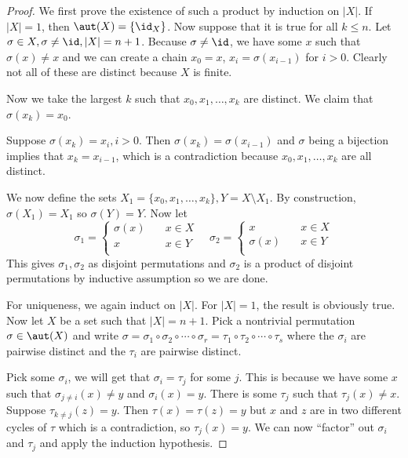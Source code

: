 \begin{proof}
We first prove the existence of such a product by induction on $|X|$. If
$|X| = 1$, then $\aut(X) = \lbrace \id_X \rbrace$. Now suppose that it
is true for all $k \leq n$. Let $\sigma \in X, \sigma \neq \id, |X| = n
+ 1$.  Because $\sigma \neq \id$, we have some $x$ such that $\sigma(x)
\neq x$ and we can create a chain $x_0 = x$, $x_i = \sigma(x_{i - 1})$
for $i > 0$. Clearly not all of these are distinct because $X$ is
finite.

Now we take the largest $k$ such that $x_0, x_1, \dots, x_k$ are
distinct. We claim that $\sigma(x_k) = x_0$.

Suppose $\sigma(x_k) = x_i, i > 0$. Then $\sigma(x_k) = \sigma(x_{i -
1})$ and $\sigma$ being a bijection implies that $x_k = x_{i - 1}$,
which is a contradiction because $x_0, x_1, \dots, x_k$ are all
distinct.

We now define the sets $X_1 = \lbrace x_0, x_1, \dots, x_k \rbrace, Y =
X \setminus X_1$. By construction, $\sigma(X_1) = X_1$ so $\sigma(Y) =
Y$. Now let
\[ \sigma_1 = \left\lbrace\begin{aligned}
\sigma(x) &\quad x \in X \\
x &\quad x \in Y \\
\end{aligned}\right. \quad \sigma_2 = \left\lbrace\begin{aligned}
x &\quad x \in X \\
\sigma(x) &\quad x \in Y \\
\end{aligned}\right. \]
This gives $\sigma_1, \sigma_2$ as disjoint permutations and $\sigma_2$
is a product of disjoint permutations by inductive assumption so we are
done.

For uniqueness, we again induct on $|X|$. For $|X| = 1$, the result is
obviously true. Now let $X$ be a set such that $|X| = n + 1$. Pick a
nontrivial permutation $\sigma \in \aut(X)$ and write $\sigma = \sigma_1
\circ \sigma_2 \circ \cdots \circ \sigma_r = \tau_1 \circ \tau_2 \circ
\cdots \circ \tau_s$ where the $\sigma_i$ are pairwise distinct and the
$\tau_i$ are pairwise distinct.

Pick some $\sigma_i$, we will get that $\sigma_i = \tau_j$ for some $j$.
This is because we have some $x$ such that $\sigma_{j \neq i}(x) \neq y$
and $\sigma_i(x) = y$. There is some $\tau_j$ such that $\tau_j(x) \neq
x$. Suppose $\tau_{k \neq j}(z) = y$. Then $\tau(x) = \tau(z) = y$ but
$x$ and $z$ are in two different cycles of $\tau$ which is a
contradiction, so $\tau_j(x) = y$. We can now ``factor'' out $\sigma_i$
and $\tau_j$ and apply the induction hypothesis.
\end{proof}

